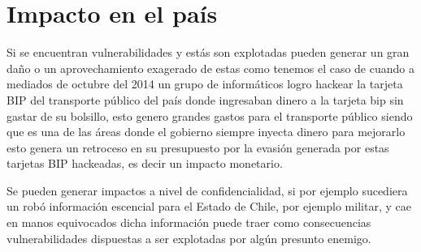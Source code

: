 \section{Impacto en el país}
Si se encuentran vulnerabilidades y estás son explotadas pueden generar un gran daño o un aprovechamiento exagerado de estas como tenemos el caso de cuando a mediados de octubre del 2014 un grupo de informáticos logro hackear la tarjeta BIP del transporte público del país donde ingresaban dinero a la tarjeta bip sin gastar de su bolsillo, esto genero grandes gastos para el transporte público siendo que es una de las áreas donde el gobierno siempre inyecta dinero para mejorarlo esto genera un retroceso en su presupuesto por la evasión generada por estas tarjetas BIP hackeadas, es decir un impacto monetario. 

Se pueden generar impactos a nivel de confidencialidad, si por ejemplo sucediera un robó información escencial para el Estado de Chile, por ejemplo militar, y cae en manos equivocados dicha información puede traer como consecuencias vulnerabilidades dispuestas a ser explotadas por algún presunto enemigo. 
